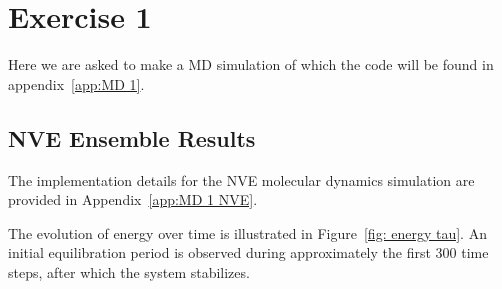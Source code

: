 \section{Exercise 1}

Here we are asked to make a MD simulation of which the code will be found in appendix~\ref{app:MD 1}.

%
%
%
%
%
\subsection{NVE Ensemble Results}

The implementation details for the NVE molecular dynamics simulation are provided in Appendix~\ref{app:MD 1 NVE}.

The evolution of energy over time is illustrated in Figure~\ref{fig: energy tau}. An initial equilibration period is observed during approximately the first 300 time steps, after which the system stabilizes.

